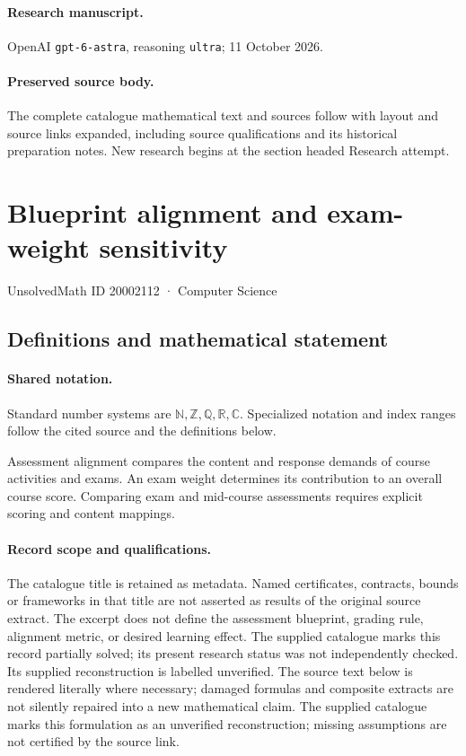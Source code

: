 \documentclass[11pt]{article}
\begin{document}
\paragraph{Research manuscript.} OpenAI \texttt{gpt-6-astra}, reasoning \texttt{ultra}; 11 October 2026.
\paragraph{Preserved source body.} The complete catalogue mathematical text and sources follow with layout and source links expanded, including source qualifications and its historical preparation notes. New research begins at the section headed Research attempt.

\section{Blueprint alignment and exam-weight sensitivity}\label{20002112}
{\small UnsolvedMath ID 20002112 · Computer Science}
\subsection{Definitions and mathematical statement}

\paragraph{Shared notation.}Standard number systems are $\mathbb N,\mathbb Z,\mathbb Q,\mathbb R,\mathbb C$. Specialized notation and index ranges follow the cited source and the definitions below.


Assessment alignment compares the content and response demands of course activities and exams. An exam weight determines its contribution to an overall course score. Comparing exam and mid-course assessments requires explicit scoring and content mappings.
\paragraph{Record scope and qualifications.}
The catalogue title is retained as metadata. Named certificates, contracts, bounds or frameworks in that title are not asserted as results of the original source extract.
The excerpt does not define the assessment blueprint, grading rule, alignment metric, or desired learning effect. The supplied catalogue marks this record partially solved; its present research status was not independently checked. Its supplied reconstruction is labelled unverified.
The source text below is rendered literally where necessary; damaged formulas and composite extracts are not silently repaired into a new mathematical claim.
The supplied catalogue marks this formulation as an unverified reconstruction; missing assumptions are not certified by the source link.
\end{document}
